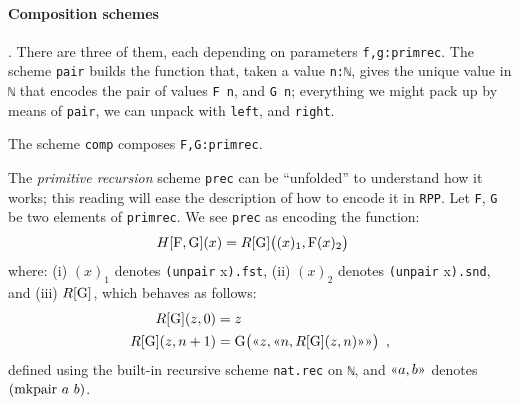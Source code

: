 \documentclass[runningheads]{llncs}
\begin{document}
\paragraph{Composition schemes}.
There are three of them, each depending on parameters \lstinline|f,g:primrec|.
The scheme \lstinline|pair| builds the function that, taken a value \lstinline|n:ℕ|, gives the unique value in \lstinline|ℕ| that encodes the pair of values \lstinline|F n|, and \lstinline|G n|; everything we might pack up by means of \lstinline|pair|, we can unpack with \lstinline|left|, and \lstinline|right|.

The scheme \lstinline|comp| composes \lstinline|F,G:primrec|.

The \emph{primitive recursion} scheme \lstinline|prec| can be ``unfolded'' to understand how it works; this reading will ease the description of how to encode it in \lstinline|RPP|.
Let \lstinline|F|, \lstinline|G| be two elements of \lstinline|primrec|. We see \lstinline|prec| as encoding the function:
\begin{align}
\label{align:function H}
H[\mbox{\lstinline|F|},\mbox{\lstinline|G|}](x) & =
R[\mbox{\lstinline|G|}]\big( (x)_1 , \mbox{\lstinline|F|} (x)_2 \big)
\end{align}
where:
(i) $(x)_1$ denotes \lstinline|(unpair| x\lstinline|).fst|,
(ii) $(x)_2$ denotes \lstinline|(unpair| x\lstinline|).snd|,
and
(iii) $R [\mbox{\lstinline|G|}] $, which behaves as follows:
\begin{equation}
\label{equation:function R}
\begin{aligned}
    R[\mbox{\lstinline|G|}](z,0) & = z \\
    R[\mbox{\lstinline|G|}](z,n+1) &
    = \mbox{\lstinline|G|} \big(
      \gl z, \gl n, R[\mbox{\lstinline|G|}](z,n) \gr \gr
      \big)
   \enspace ,
\end{aligned}
\end{equation}
defined using the built-in recursive scheme \lstinline|nat.rec| on \lstinline|ℕ|, and $ \gl a, b \gr $ denotes $ (\mbox{\lstinline|mkpair|}\ a\ b) $.

\end{document}
